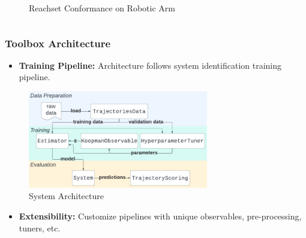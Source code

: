 \documentclass[shortpres,aspectratio=43]{beamer}
\begin{document}
\begin{frame}[fragile]
\begin{columns}
\begin{column}{0.45\linewidth}
\begin{figure}
\caption{Reachset Conformance on Robotic Arm}
\end{figure}
\end{column}
\end{columns}
\end{frame}

\begin{frame}
\frametitle{Toolbox Architecture}
\begin{itemize}
    \item<1-> \textbf{Training Pipeline:} Architecture follows system identification training pipeline.
\end{itemize}
\begin{figure}
  \centering
  \includegraphics[width=0.7\textwidth]{./img/autokoopman_objects.pdf} %
  \caption{System Architecture}
\end{figure}
\begin{itemize}
    \item<2-> \textbf{Extensibility:} Customize pipelines with unique observables, pre-processing, tuners, etc.
\end{itemize}
\end{frame}
\end{document}
